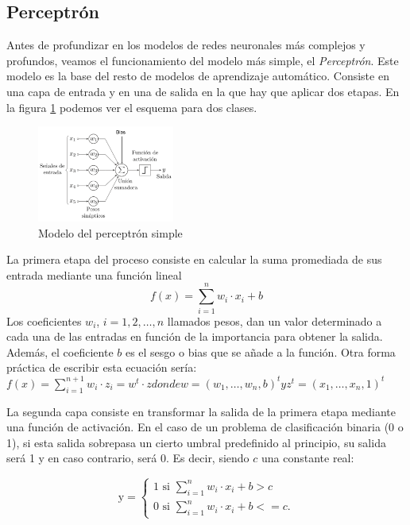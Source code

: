 \subsection{Perceptrón}

Antes de profundizar en los modelos de redes neuronales más complejos y profundos, veamos el funcionamiento del modelo más simple, el \textit{Perceptrón}. Este modelo es la base del resto de modelos de aprendizaje automático. Consiste en una capa de entrada y en una de salida en la que hay que aplicar dos etapas. En la figura \ref{img: perceptron} podemos ver el esquema para dos clases.

\begin{figure}[h!]
    \centering
    \includegraphics[width=0.4\textwidth]{img/perceptron.png}
    \caption{Modelo del perceptrón simple}
    \label{img: perceptron}
\end{figure}

La primera etapa del proceso consiste en calcular la suma promediada de sus entrada mediante una función lineal
\begin{equation}
f(x) = \sum_{i=1}^{n} w_i \cdot x_i + b
\end{equation}
Los coeficientes $w_i$, $i=1,2, \ldots, n$ llamados pesos, dan un valor determinado a cada una de las entradas en función de la importancia para obtener la salida. Además, el coeficiente $b$ es el sesgo o bias que se añade a la función. Otra forma práctica de escribir esta ecuación sería: $f(x) = \sum_{i=1}^{n+1} w_i \cdot z_i = w^t\cdot z  donde w = (w_1, \ldots, w_n, b)^t y z^t = (x_1, \ldots, x_n, 1)^t$

La segunda capa consiste en transformar la salida de la primera etapa mediante una función de activación. En el caso de un problema de clasificación binaria (0 o 1), si esta salida sobrepasa un cierto umbral predefinido al principio, su salida será 1 y en caso contrario, será 0. Es decir, siendo $c$ una constante real:

\begin{equation}
\text{y} = 
\begin{cases} 
1  \text{  si  }  \sum_{i=1}^{n} w_i \cdot x_i + b > c\\
0  \text{  si  }  \sum_{i=1}^{n} w_i \cdot x_i + b <= c.
\end{cases}
\end{equation}












